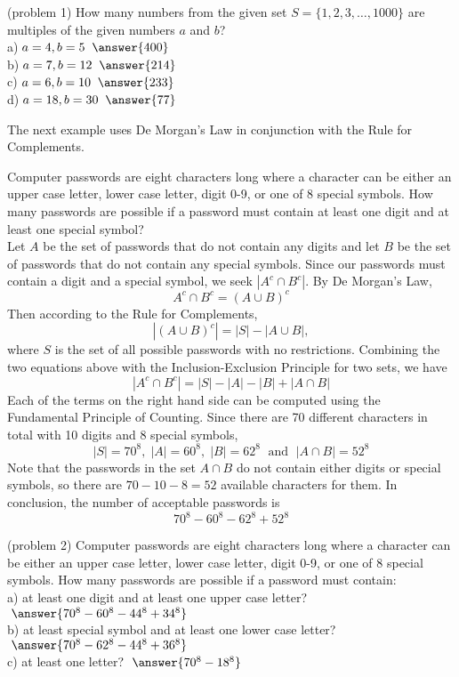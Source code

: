 \documentclass[handout]{ximera}
\begin{document}
\begin{problem}(problem 1)
How many numbers from the given set $S= \{1,2,3, \ldots, 1000\}$ are multiples of the given numbers $a$ and $b$?\\
a)$\; a = 4, b = 5 \;\; \answer{400}$\\
b)$\;  a = 7, b = 12 \;\; \answer{214}$\\
c)$\; a = 6, b = 10 \;\; \answer{233}$\\
d)$\;  a = 18, b = 30 \;\; \answer{77}$ \\
\end{problem}

The next example uses De Morgan's Law in conjunction with the Rule for Complements.

\begin{example}[example 2]
Computer passwords are eight characters long where a character can be either an upper case letter, 
lower case letter, digit 0-9, or one of 8 special symbols. 
How many passwords are possible if a password must contain at least one digit and at least one special symbol?\\

Let $A$ be the set of passwords that do not contain any digits and let $B$ be the set of passwords that do not
contain any special symbols. Since our passwords must contain a digit and a special symbol, we seek $|A^c \cap B^c|$.
By De Morgan's Law, 
\[
A^c \cap B^c = (A \cup B)^c
\]
Then according to the Rule for Complements,
\[
|(A \cup B)^c| = |S| - |A \cup B|,
\]
where $S$ is the set of all possible passwords with no restrictions. 
Combining the two equations above with the Inclusion-Exclusion Principle for two sets, we have
\[
|A^c \cap B^c| = |S| - |A| - |B| + |A\cap B|
\]
Each of the terms on the right hand side can be computed using the Fundamental Principle of Counting. Since there are
70 different characters in total with 10 digits and 8 special symbols,
\[
|S| = 70^8, \; |A| = 60^8, \; |B| = 62^8 \; \text{ and } \; |A\cap B| = 52^8
\]
Note that the passwords in the set $A \cap B$ do not contain either digits or special symbols, so there are $70-10-8 = 52$
available characters for them. In conclusion, the number of acceptable passwords is
\[
70^8 - 60^8 - 62^8 + 52^8
\]

\end{example}

\begin{problem}(problem 2)
Computer passwords are eight characters long where a character can be either an upper case letter, 
lower case letter, digit 0-9, or one of 8 special symbols. 
How many passwords are possible if a password must contain:\\
a) at least one digit and at least one upper case letter? $\; \answer{70^8 - 60^8 - 44^8 + 34^8}$\\
b) at least special symbol and at least one lower case letter? $\; \answer{70^8 - 62^8 - 44^8 + 36^8}$\\
c) at least one letter? $\; \answer{70^8 - 18^8}$\\
\end{problem}
\end{document}
